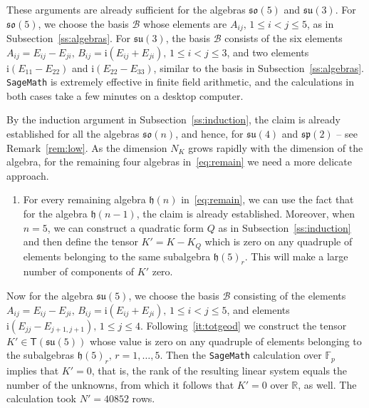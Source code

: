 \documentclass[12pt,reqno]{amsart}
\newcommand \br{\mathbb{R}}
\newcommand \F{\mathbb{F}}
\newcommand \cB{\mathcal{B}}
\newcommand \sT{\mathsf{T}}
\newcommand\h{\mathfrak h}
\newcommand \so{\mathfrak{so}}
\newcommand \spg{\mathfrak{sp}}
\newcommand \su{\mathfrak{su}}
\newcommand \ir{\mathrm{i}}
\newcommand \<{\langle}
\renewcommand \>{\rangle}
\theoremstyle{definition}
\theoremstyle{remark}
\begin{document}
These arguments are already sufficient for the algebras $\so(5)$ and $\su(3)$. For $\so(5)$, we choose the basis $\cB$ whose elements are $A_{ij}, \, 1 \le i < j\le 5$, as in Subsection~\ref{ss:algebras}. For $\su(3)$, the basis $\cB$ consists of the six elements $A_{ij} = E_{ij} - E_{ji}, \, B_{ij} = \ir (E_{ij} + E_{ji}), \, 1 \le i < j\le 3$, and two elements $\ir (E_{11} - E_{22})$ and $\ir (E_{22} - E_{33})$, similar to the basis in Subsection~\ref{ss:algebras}. \texttt{SageMath} is extremely effective in finite field arithmetic, and the calculations in both cases take a few minutes on a desktop computer.

By the induction argument in Subsection~\ref{ss:induction}, the claim is already established for all the algebras $\so(n)$, and hence, for $\su(4)$ and $\spg(2)$ -- see Remark~\ref{rem:low}. As the dimension $N_K$ grows rapidly with the dimension of the algebra, for the remaining four algebras in~\eqref{eq:remain} we need a more delicate approach.

\begin{enumerate}[resume,label=(\Roman*),ref=\Roman*]
     \item \label{it:totgeod}
     For every remaining algebra $\h(n)$ in~\eqref{eq:remain}, we can use the fact that for the algebra $\h(n-1)$, the claim is already established. Moreover, when $n = 5$, we can construct a quadratic form $Q$ as in Subsection~\ref{ss:induction} and then define the tensor $K'=K-K_Q$ which is zero on any quadruple of elements belonging to the same subalgebra $\h(5)_r$. This will make a large number of components of $K'$ zero.
\end{enumerate}

Now for the algebra $\su(5)$, we choose the basis $\cB$ consisting of the elements $A_{ij} = E_{ij} - E_{ji}, \, B_{ij} = \ir (E_{ij} + E_{ji}), \, 1 \le i < j\le 5$, and elements $\ir (E_{jj} - E_{j+1,j+1}), \, 1 \le j \le 4$. Following~\eqref{it:totgeod} we construct the tensor $K' \in \sT(\su(5))$ whose value is zero on any quadruple of elements belonging to the subalgebras $\h(5)_r, \, r=1,\dots,5$. Then the \texttt{SageMath} calculation over $\F_p$ implies that $K' = 0$, that is, the rank of the resulting linear system equals the number of the unknowns, from which it follows that $K' = 0$ over $\br$, as well. The calculation took $N'=40 852$ rows.

\smallskip
\end{document}
